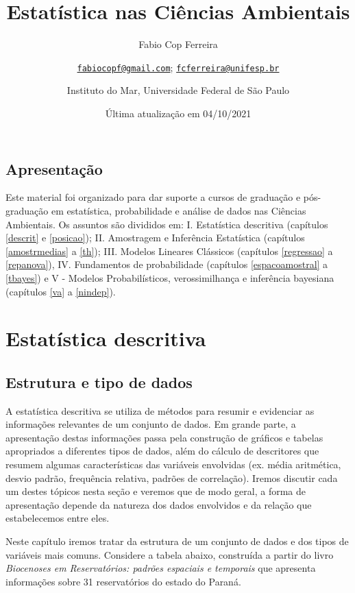\documentclass[
]{book}
\title{Estatística nas Ciências Ambientais}
\author{Fabio Cop Ferreira \and \href{mailto:fabiocopf@gmail.com}{\nolinkurl{fabiocopf@gmail.com}}; \href{mailto:fcferreira@unifesp.br}{\nolinkurl{fcferreira@unifesp.br}} \and Instituto do Mar, Universidade Federal de São Paulo}
\date{Última atualização em 04/10/2021}
\begin{document}
\maketitle

{
\setcounter{tocdepth}{1}
\tableofcontents
}
\hypertarget{apresentauxe7uxe3o}{%
\chapter*{Apresentação}\label{apresentauxe7uxe3o}}

Este material foi organizado para dar suporte a cursos de graduação e pós-graduação em estatística, probabilidade e análise de dados nas Ciências Ambientais. Os assuntos são divididos em: I. Estatística descritiva (capítulos \ref{descrit} e \ref{posicao}); II. Amostragem e Inferência Estatística (capítulos \ref{amostrmedias} a \ref{th}); III. Modelos Lineares Clássicos (capítulos \ref{regressao} a \ref{repanova}), IV. Fundamentos de probabilidade (capítulos \ref{espacoamostral} a \ref{tbayes}) e V - Modelos Probabilísticos, verossimilhança e inferência bayesiana (capítulos \ref{va} a \ref{nindep}).

\hypertarget{part-estatuxedstica-descritiva}{%
\part{Estatística descritiva}\label{part-estatuxedstica-descritiva}}

\hypertarget{estr_dados}{%
\chapter{Estrutura e tipo de dados}\label{estr_dados}}

A estatística descritiva se utiliza de métodos para resumir e evidenciar as informações relevantes de um conjunto de dados. Em grande parte, a apresentação destas informações passa pela construção de gráficos e tabelas apropriados a diferentes tipos de dados, além do cálculo de descritores que resumem algumas características das variáveis envolvidas (ex. média aritmética, desvio padrão, frequência relativa, padrões de correlação). Iremos discutir cada um destes tópicos nesta seção e veremos que de modo geral, a forma de apresentação depende da natureza dos dados envolvidos e da relação que estabelecemos entre eles.

Neste capítulo iremos tratar da estrutura de um conjunto de dados e dos tipos de variáveis mais comuns. Considere a tabela abaixo, construída a partir do livro \emph{Biocenoses em Reservatórios: padrões espaciais e temporais} \citep{rodriguesetal2005} que apresenta informações sobre 31 reservatórios do estado do Paraná.
\end{document}
